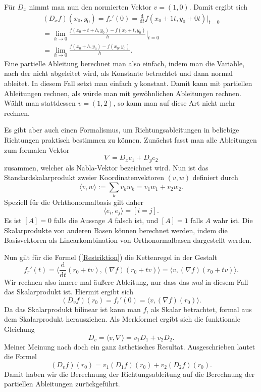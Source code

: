 \documentclass[a4paper,12pt,fleqn]{article}
\begin{document}
Für \(D_x\) nimmt man nun den normierten Vektor \(v=(1,0)\).
Damit ergibt sich
\begin{gather*}
(D_x f)(x_0,y_0) = f_r'(0)
= \frac{\mathrm d}{\mathrm dt} f(x_0+1t,y_0+0t)\Big|_{t=0}\\
= \lim_{h\rightarrow 0} \frac{f(x_0+t+h,y_0)-f(x_0+t,y_0)}{h}\Big|_{t=0}\\
= \lim_{h\rightarrow 0} \frac{f(x_0+h,y_0)-f(x_0,y_0)}{h}.
\end{gather*}
Eine partielle Ableitung berechnet man also einfach, indem man
die Variable, nach der nicht abgeleitet wird, als Konstante
betrachtet und dann normal ableitet. In diesem Fall setzt man einfach
\(y\) konstant. Damit kann mit partiellen Ableitungen rechnen,
als würde man mit gewöhnlichen Ableitungen rechnen. Wählt man
stattdessen \(v=(1,2)\), so kann man auf diese Art nicht mehr
rechnen.

Es gibt aber auch einen Formalismus, um Richtungsableitungen
in beliebige Richtungen praktisch bestimmen zu können.
Zunächst fasst man alle Ableitungen zum formalen Vektor
\begin{equation}
\nabla = D_x e_1+D_y e_2
\end{equation}
zusammen, welcher als Nabla-Vektor bezeichnet wird. Nun ist das
Standardskalarprodukt zweier Koordinatenvektoren \((v,w)\) definiert
durch
\begin{equation}
\langle v,w\rangle := \sum_k v_k w_k = v_1 w_1+v_2 w_2.
\end{equation}
Speziell für die Orhthonormalbasis gilt daher
\begin{equation}
\langle e_i,e_j\rangle = [i=j].
\end{equation}
Es ist \([A]=0\) falls die Aussage \(A\) falsch ist, und \([A]=1\)
falls \(A\) wahr ist. Die Skalarprodukte von anderen Basen können
berechnet werden, indem die Basisvektoren als Linearkombination
von Orthonormalbasen dargestellt werden.

Nun gilt für die Formel (\ref{Restriktion}) die Kettenregel
in der Gestalt
\begin{equation}
f_r'(t) = \langle\frac{\mathrm d}{\mathrm dt}(r_0+tv),
(\nabla f)(r_0+tv)\rangle
= \langle v,(\nabla f)(r_0+tv)\rangle.
\end{equation}
Wir rechnen also innere mal äußere Ableitung, nur dass das
\textit{mal} in diesem Fall das Skalarprodukt ist. Hiermit ergibt
sich
\begin{equation}
(D_v f)(r_0) = f_r'(0) = \langle v,(\nabla f)(r_0)\rangle.
\end{equation}
Da das Skalarprodukt bilinear ist kann man \(f\), als Skalar
betrachtet, formal aus dem Skalarprodukt herausziehen.
Als Merkformel ergibt sich die funktionale Gleichung
\begin{equation}\label{Richtungsableitung}
D_v = \langle v,\nabla\rangle = v_1D_1+v_2D_2.
\end{equation}
Meiner Meinung nach doch ein ganz ästhetisches Resultat.
Ausgeschrieben lautet die Formel
\begin{equation}\label{RAexpandiert}
(D_v f)(r_0) = v_1(D_1 f)(r_0)+ v_2(D_2 f)(r_0).
\end{equation}
Damit haben wir die Berechnung der Richtungsableitung auf
die Berechnung der partiellen Ableitungen zurückgeführt.
\end{document}
